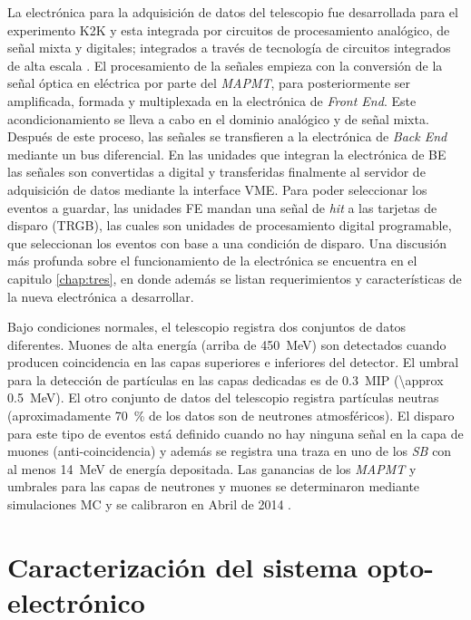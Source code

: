 La electrónica para la adquisición de datos del telescopio fue desarrollada para el experimento K2K y esta integrada por circuitos de procesamiento analógico, de señal mixta y digitales; integrados a través de tecnología de circuitos integrados de alta escala \cite{myoshi04}. El procesamiento de la señales empieza con la conversión de la señal óptica en eléctrica por parte del \emph{MAPMT}, para posteriormente ser amplificada, formada y multiplexada en la electrónica de \emph{Front End}. Este acondicionamiento se lleva a cabo en el dominio analógico y de señal mixta. Después de este proceso, las señales se transfieren a la electrónica de \emph{Back End} mediante un bus diferencial. En las unidades que integran la electrónica de BE las señales son convertidas a digital y transferidas finalmente al servidor de adquisición de datos mediante la interface VME. Para poder seleccionar los eventos a guardar, las unidades FE mandan una señal de \emph{hit} a las tarjetas de disparo (TRGB), las cuales son unidades de procesamiento digital programable, que seleccionan los eventos con base a una condición de disparo. Una discusión más profunda sobre el funcionamiento de la electrónica se encuentra en el capitulo \ref{chap:tres}, en donde además se listan requerimientos y características de la nueva electrónica a desarrollar.

Bajo condiciones normales, el telescopio registra dos conjuntos de datos diferentes. Muones de alta energía (arriba de \SI{450}{\mega\electronvolt}) son detectados cuando producen coincidencia en las capas superiores e inferiores del detector. El umbral para la detección de partículas en las capas dedicadas es de \SI{0.3}{MIP} (\SI{\approx 0.5}{\mega\electronvolt}). El otro conjunto de datos del telescopio registra partículas neutras (aproximadamente \SI{70}{\percent} de los datos son de neutrones atmosféricos). El disparo para este tipo de eventos está definido cuando no hay ninguna señal en la capa de muones (anti-coincidencia) y además se registra una traza en uno de los \emph{SB} con al menos \SI{14}{\mega\electronvolt} de energía depositada. Las ganancias de los \emph{MAPMT} y umbrales para las capas de neutrones y muones se determinaron mediante simulaciones MC y se calibraron en Abril de \num{2014} \cite{ysasai14}.

\section{Caracterización del sistema opto-electrónico}

